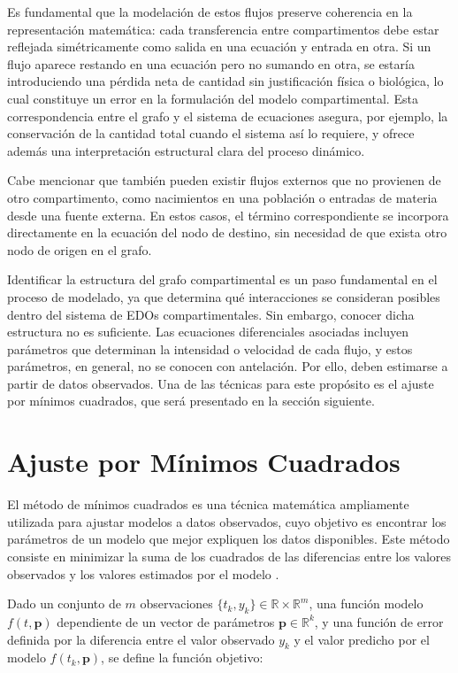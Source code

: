 Es fundamental que la modelación de estos flujos preserve coherencia en la representación matemática: cada transferencia entre compartimentos debe estar reflejada 
simétricamente como salida en una ecuación y entrada en otra. Si un flujo aparece restando en una ecuación pero no sumando en otra, se estaría introduciendo una 
pérdida neta de cantidad sin justificación física o biológica, lo cual constituye un error en la formulación del modelo compartimental. Esta correspondencia entre el 
grafo y el sistema de ecuaciones asegura, por ejemplo, la conservación de la cantidad total cuando el sistema así lo requiere, y ofrece además una interpretación 
estructural clara del proceso dinámico.

Cabe mencionar que también pueden existir flujos externos que no provienen de otro compartimento, como nacimientos en una población o entradas de materia desde una 
fuente externa. En estos casos, el término correspondiente se incorpora directamente en la ecuación del nodo de destino, sin necesidad de que exista otro nodo de 
origen en el grafo.

Identificar la estructura del grafo compartimental es un paso fundamental en el proceso de modelado, ya que determina qué interacciones se consideran posibles dentro 
del sistema de EDOs compartimentales. Sin embargo, conocer dicha estructura no es suficiente. Las ecuaciones diferenciales asociadas incluyen parámetros que determinan 
la intensidad o velocidad de cada flujo, y estos parámetros, en general, no se conocen con antelación. Por ello, deben estimarse a partir de datos observados. Una de 
las técnicas para este propósito es el ajuste por mínimos cuadrados, que será presentado en la sección siguiente.

\section{Ajuste por Mínimos Cuadrados}
\label{sec:mincuad}

El método de mínimos cuadrados es una técnica matemática ampliamente utilizada para ajustar modelos a datos observados, cuyo objetivo es encontrar los 
parámetros de un modelo que mejor expliquen los datos disponibles. Este método consiste en minimizar la suma de los cuadrados de las diferencias entre 
los valores observados y los valores estimados por el modelo \cite{Stigler81}.

Dado un conjunto de \( m \) observaciones \(\{t_k, y_k\} \in \mathbb{R} \times \mathbb{R}^m\), una función modelo \( f(t, \mathbf{p}) \) dependiente de un vector de 
parámetros \( \mathbf{p} \in \mathbb{R}^k \), y una función de error definida por la diferencia entre el valor observado \( y_k \) y el valor predicho por el modelo 
\( f(t_k, \mathbf{p}) \), se define la función objetivo:

